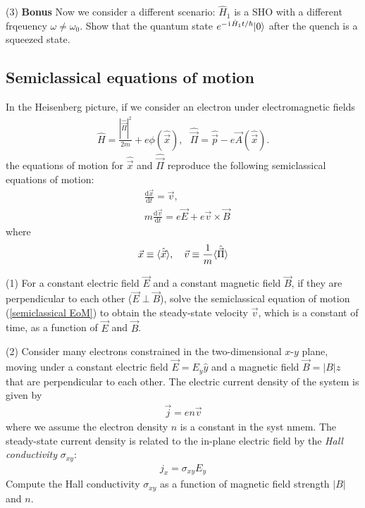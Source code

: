 (3) \textbf{Bonus} Now we consider a different scenario: $\hat H_1$ is a SHO with a different frqeuency $\omega\neq\omega_0$. Show that the quantum state $e^{-\hspace{1pt}\mathrm{i}\hspace{1pt}\hat H_1t/\hbar}|{0}\rangle$ after the quench is a squeezed state. 


\subsection{Semiclassical equations of motion}

In the Heisenberg picture, if we consider an electron under electromagnetic fields
\begin{align}
\hat H=\frac{|\hat{\vec\Pi}|^2}{2m}+e\phi(\hat{\vec x}),~~~\hat{\vec\Pi}=\hat{\vec p}-e\vec A(\hat{\vec x}).
\end{align}
the equations of motion for $\hat{\vec x}$ and $\hat{\vec\Pi}$ reproduce the following semiclassical equations of motion:
\begin{align}
&\frac{\text{d}\vec x}{\text{d}t}=\vec v,\\
&m\frac{\text{d}\vec v}{\text{d}t}=e\vec E+e\vec v\times\vec B\label{semiclassical EoM}
\end{align}
where
\begin{align}
\vec x\equiv\langle{\hat{\vec x}}\rangle,~~~\vec v\equiv\frac1m\langle{\hat{\vec\Pi}}\rangle
\end{align}

(1) For a constant electric field $\vec E$ and a constant magnetic field $\vec B$, if they are perpendicular to each other ($\vec E\perp\vec B$), solve the semiclassical equation of motion (\ref{semiclassical EoM}) to obtain the steady-state velocity $\vec v$, which is a constant of time, as a function of $\vec E$ and $\vec B$. 

(2) Consider many electrons constrained in the two-dimensional $x$-$y$ plane, moving under a constant electric field $\vec E=E_y\hat y$ and a magnetic field $\vec B=|B|\hat z$ that are perpendicular to each other. The electric current density of the system is given by
\begin{align}
\vec j=en\vec v
\end{align}
where we assume the electron density $n$ is a constant in the syst nmem. The steady-state current density is related to the in-plane electric field by the \emph{Hall conductivity} $\sigma_{xy}$:
\begin{align}
j_x=\sigma_{xy}E_y
\end{align}
Compute the Hall conductivity $\sigma_{xy}$ as a function of magnetic field strength $|B|$ and $n$. 


